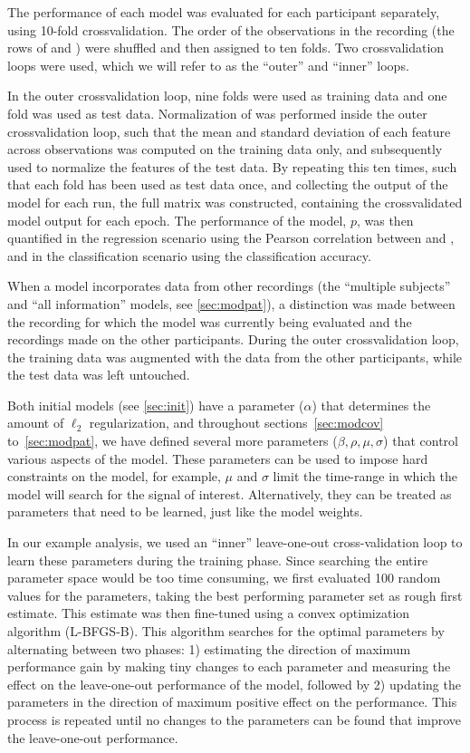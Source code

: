 \documentclass[a4paper]{vanvliet_paper}
\begin{document}
The performance of each model was evaluated for each participant separately, using 10-fold crossvalidation.
The order of the observations in the recording (the rows of  and ) were shuffled and then assigned to ten folds.
Two crossvalidation loops were used, which we will refer to as the ``outer'' and ``inner'' loops.

In the outer crossvalidation loop, nine folds were used as training data and one fold was used as test data.
Normalization of  was performed inside the outer crossvalidation loop, such that the mean and standard deviation of each feature across observations was computed on the training data only, and subsequently used to normalize the features of the test data.
By repeating this ten times, such that each fold has been used as test data once, and collecting the output of the model for each run, the full matrix  was constructed, containing the crossvalidated model output for each epoch.
The performance of the model, $p$, was then quantified in the regression scenario using the Pearson correlation between  and , and in the classification scenario using the classification accuracy.

When a model incorporates data from other recordings (the ``multiple subjects'' and ``all information'' models, see \autoref{sec:modpat}), a distinction was made between the recording for which the model was currently being evaluated and the recordings made on the other participants.
During the outer crossvalidation loop, the training data was augmented with the data from the other participants, while the test data was left untouched.

Both initial models (see \autoref{sec:init}) have a parameter ($\alpha$) that determines the amount of $\ell_2$ regularization, and throughout sections~\ref{sec:modcov} to~\ref{sec:modpat}, we have defined several more parameters ($\beta, \rho, \mu, \sigma$) that control various aspects of the model.
These parameters can be used to impose hard constraints on the model, for example, $\mu$ and $\sigma$ limit the time-range in which the model will search for the signal of interest.
Alternatively, they can be treated as parameters that need to be learned, just like the model weights.

In our example analysis, we used an ``inner'' leave-one-out cross-validation loop to learn these parameters during the training phase.
Since searching the entire parameter space would be too time consuming, we first evaluated 100 random values for the parameters, taking the best performing parameter set as rough first estimate.
This estimate was then fine-tuned using a convex optimization algorithm (\gls{L-BFGS-B}\cite{Byrd1995}).
This algorithm searches for the optimal parameters by alternating between two phases: 1) estimating the direction of maximum performance gain by making tiny changes to each parameter and measuring the effect on the leave-one-out performance of the model, followed by 2) updating the parameters in the direction of maximum positive effect on the performance.
This process is repeated until no changes to the parameters can be found that improve the leave-one-out performance.
\end{document}
